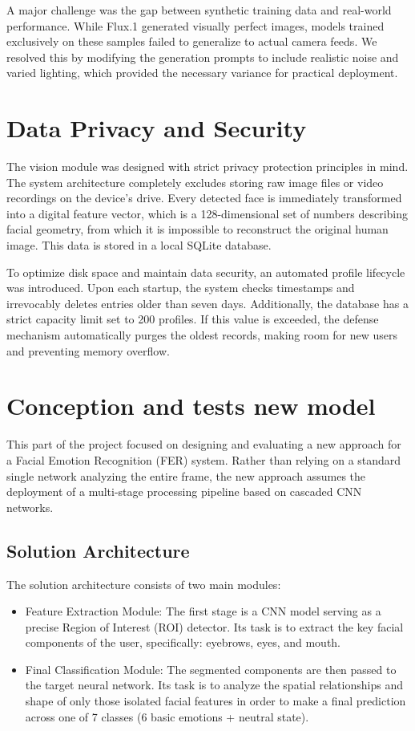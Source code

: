 \documentclass{article}
\begin{document}
A major challenge was the gap between synthetic training data and real-world performance. While Flux.1 generated visually perfect images, models trained exclusively on these samples failed to generalize to actual camera feeds. We resolved this by modifying the generation prompts to include realistic noise and varied lighting, which provided the necessary variance for practical deployment.

\section{Data Privacy and Security}
The vision module was designed with strict privacy protection principles in mind. The system architecture completely excludes storing raw image files or video recordings on the device's drive. Every detected face is immediately transformed into a digital feature vector, which is a 128-dimensional set of numbers describing facial geometry, from which it is impossible to reconstruct the original human image. This data is stored in a local SQLite database.

To optimize disk space and maintain data security, an automated profile lifecycle was introduced. Upon each startup, the system checks timestamps and irrevocably deletes entries older than seven days. Additionally, the database has a strict capacity limit set to 200 profiles. If this value is exceeded, the defense mechanism automatically purges the oldest records, making room for new users and preventing memory overflow.

\section{Conception and tests new model}
This part of the project focused on designing and evaluating a new approach for a Facial Emotion Recognition (FER) system. Rather than relying on a standard single network analyzing the entire frame, the new approach assumes the deployment of a multi-stage processing pipeline based on cascaded CNN networks.

\subsection{Solution Architecture}
The solution architecture consists of two main modules:

\begin{itemize}
    \item Feature Extraction Module: The first stage is a CNN model serving as a precise Region of Interest (ROI) detector. Its task is to extract the key facial components of the user, specifically: eyebrows, eyes, and mouth.
    \item Final Classification Module: The segmented components are then passed to the target neural network. Its task is to analyze the spatial relationships and shape of only those isolated facial features in order to make a final prediction across one of 7 classes (6 basic emotions + neutral state).
\end{itemize}
\end{document}
